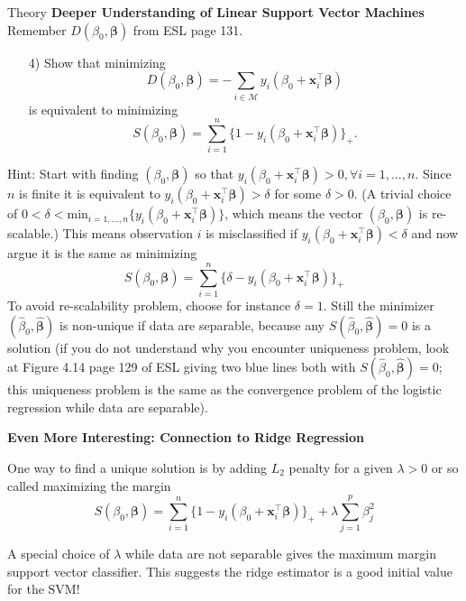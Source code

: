 \begin{slide}{Theory}
{\bf Deeper Understanding of Linear Support Vector Machines}\\
\bigskip
Remember $D(\beta_0,\boldsymbol \beta)$ from ESL page 131.\\
\begin{itemize}
\item[4)]
Show that minimizing 
$$D(\beta_0,\boldsymbol \beta)=-\sum\limits_{i\in\mathcal M}
y_i(\beta_0 + \mathbf x_i^\top \boldsymbol \beta )$$ 
is equivalent to minimizing 
$$S(\beta_0,\boldsymbol \beta)=\sum
_{i=1}^n \{1-y_i(\beta_0+\mathbf x_i^\top\boldsymbol \beta)\}_+.$$
\end{itemize}
\smallskip
Hint: Start with finding $(\beta_0,\boldsymbol \beta)$ so that $y_i(\beta_0+\mathbf  x_i^\top\boldsymbol \beta) >0, \forall i=1,\ldots,n$. Since $n$ is finite it is equivalent to $y_i(\beta_0+\mathbf x_i^\top\boldsymbol \beta) >\delta$  for some $\delta>0$. (A trivial choice of $0<\delta<\mathrm{min}_{i=1,\ldots,n} \{y_i(\beta_0+\mathbf  x_i^\top\boldsymbol \beta)\} $, which means the vector $(\beta_0,\boldsymbol \beta)$ is re-scalable.) 
\bigskip
This means observation $i$ is misclassified if $y_i(\beta_0+\mathbf  x_i^\top\boldsymbol \beta)<\delta$ and now argue it is the same as minimizing 
$$S(\beta_0,\boldsymbol \beta)=\sum_{i=1}^n \{\delta-y_i(\beta_0+\mathbf  x_i^\top\boldsymbol \beta)\}_+$$ To avoid re-scalability problem, choose for instance $\delta=1$. Still the minimizer $(\hat \beta_0,\hat{\boldsymbol \beta})$ is non-unique if data are separable, because any $S(\hat\beta_0,\hat{\boldsymbol \beta})=0$ is a solution (if you do not understand why you encounter uniqueness problem, look at Figure 4.14 page 129 of ESL giving two blue lines both with $S(\hat\beta_0,\hat{\boldsymbol \beta})=0$; this uniqueness problem is the same as the convergence problem of the logistic regression while data are separable).
\bigskip


{\bf Even More Interesting: Connection to Ridge Regression}


\bigskip


One way to find a unique solution is by adding $L_2$ penalty for a given $\lambda>0$ or so called maximizing the margin
$$S(\beta_0,\boldsymbol \beta)=\sum_{i=1}^n \{1-y_i(\beta_0+\mathbf  x_i^\top\boldsymbol \beta)\}_+ +\lambda \sum_{j=1}^p \beta_j^2$$

A special choice of $\lambda$ while data are not separable gives the maximum margin support vector classifier. This suggests the ridge estimator is a good initial value for the SVM!
\end{slide}


